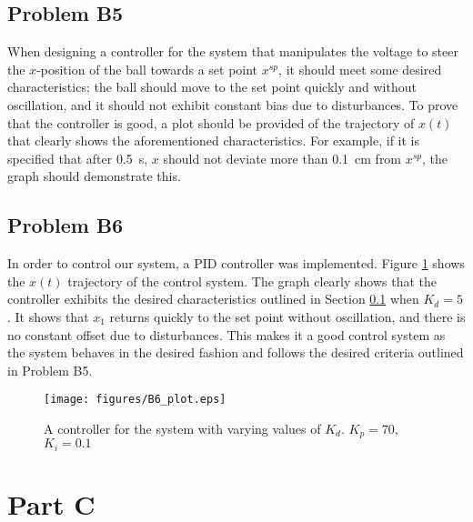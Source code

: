 \documentclass[a4paper,10pt,reqno]{amsart}
\numberwithin{equation}{section}
\begin{document}
\subsection{Problem B5}\label{sec:b5}

When designing a controller for the system that manipulates the voltage to steer the $x$-position of the ball towards a set point $x^{sp}$, it should meet some desired characteristics; the ball should move to the set point quickly and without oscillation, and it should not exhibit constant bias due to disturbances. To prove that the controller is good, a plot should be provided of the trajectory of $x(t)$ that clearly shows the aforementioned characteristics. For example, if it is specified that after 0.5~s, $x$ should not deviate more than 0.1~cm from $x^{sp}$, the graph should demonstrate this.

\subsection{Problem B6} In order to control our system, a PID controller was implemented. Figure \ref{fig:B6_plot} shows the $x(t)$ trajectory of the control system. The graph clearly shows that the controller exhibits the desired characteristics outlined in Section \ref{sec:b5} when $K_d = 5$. It shows that $x_1$ returns quickly to the set point without oscillation, and there is no constant offset due to disturbances. This makes it  a good control system as the system behaves in the desired fashion and follows the desired criteria outlined in Problem B5.

\begin{figure}[h]
     \texttt{[image: figures/B6\_plot.eps]}
     \caption{A controller for the system with varying values of $K_d$. $K_p = 70$, $K_i = 0.1$}
     \label{fig:B6_plot}
\end{figure}


\section{Part C}
\end{document}
